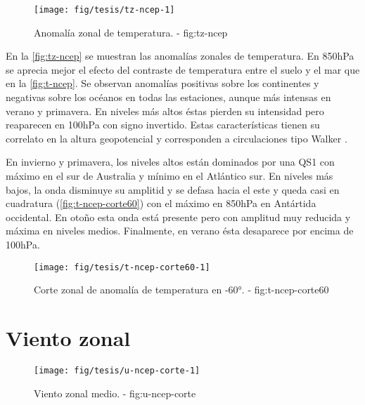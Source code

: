 \documentclass[spanish,a4paper]{book}
\begin{document}
\begin{figure}

{\centering \texttt{[image: fig/tesis/tz-ncep-1]} 

}

\caption{Anomalía zonal de temperatura. - fig:tz-ncep}\label{fig:tz-ncep}
\end{figure}

En la \autoref{fig:tz-ncep} se muestran las anomalías zonales de
temperatura. En 850hPa se aprecia mejor el efecto del contraste de
temperatura entre el suelo y el mar que en la \autoref{fig:t-ncep}. Se
observan anomalías positivas sobre los continentes y negativas sobre los
océanos en todas las estaciones, aunque más intensas en verano y
primavera. En niveles más altos éstas pierden su intensidad pero
reaparecen en 100hPa con signo invertido. Estas características tienen
su correlato en la altura geopotencial y corresponden a circulaciones
tipo Walker .

En invierno y primavera, los niveles altos están dominados por una QS1
con máximo en el sur de Australia y mínimo en el Atlántico sur. En
niveles más bajos, la onda disminuye su amplitid y se defasa hacia el
este y queda casi en cuadratura (\autoref{fig:t-ncep-corte60}) con el
máximo en 850hPa en Antártida occidental. En otoño esta onda está
presente pero con amplitud muy reducida y máxima en niveles medios.
Finalmente, en verano ésta desaparece por encima de 100hPa.

\begin{figure}

{\centering \texttt{[image: fig/tesis/t-ncep-corte60-1]} 

}

\caption{Corte zonal de anomalía de temperatura en -60°. - fig:t-ncep-corte60}\label{fig:t-ncep-corte60}
\end{figure}

\section{Viento zonal}\label{viento-zonal}

\begin{figure}

{\centering \texttt{[image: fig/tesis/u-ncep-corte-1]} 

}

\caption{Viento zonal medio. - fig:u-ncep-corte}\label{fig:u-ncep-corte}
\end{figure}
\end{document}
